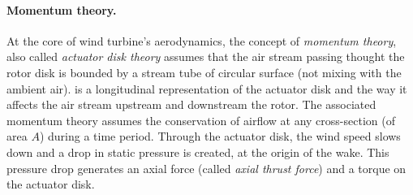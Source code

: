 \paragraph{Momentum theory.}
At the core of wind turbine's aerodynamics, the concept of \textit{momentum theory}, also called \textit{actuator disk theory} assumes that the air stream passing thought the rotor disk is bounded by a stream tube of circular surface (not mixing with the ambient air). 
 is a longitudinal representation of the actuator disk and the way it affects the air stream upstream and downstream the rotor. 
The associated momentum theory assumes the conservation of airflow at any cross-section (of area $A$) during a time period. 
Through the actuator disk, the wind speed slows down and a drop in static pressure is created, at the origin of the wake. 
This pressure drop generates an axial force (called \textit{axial thrust force}) and a torque on the actuator disk.

